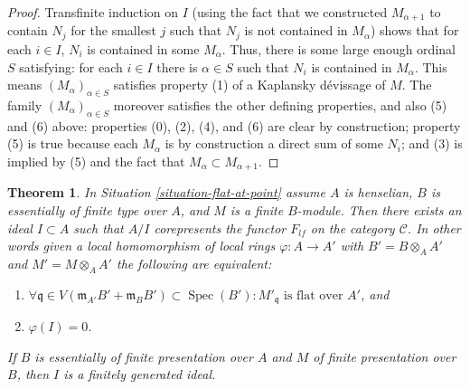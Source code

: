\documentclass{amsart}
\theoremstyle{plain}
\newtheorem{theorem}[subsection]{Theorem}
\theoremstyle{definition}
\theoremstyle{remark}
\numberwithin{equation}{subsection}
\def\Spec{\mathop{\mathrm{Spec}}}
\begin{document}
\begin{proof}
\medskip\noindent
Transfinite induction on $I$ (using the fact that we constructed
$M_{\alpha + 1}$
to contain $N_j$ for the smallest $j$ such that $N_j$ is not contained in
$M_{\alpha}$) shows that for each $i \in I$, $N_i$ is contained in some
$M_{\alpha}$.  Thus, there is some large enough ordinal $S$ satisfying: for
each $i \in I$ there is $\alpha \in S$ such that $N_i$ is contained in
$M_{\alpha}$.  This means $(M_{\alpha})_{\alpha \in S}$ satisfies property (1)
of a Kaplansky d\'evissage of $M$.  The family $(M_{\alpha})_{\alpha \in S}$
moreover satisfies the other defining properties, and also (5) and (6) above:
properties (0), (2), (4), and (6) are clear by construction;  property (5) is
true because each $M_{\alpha}$ is by construction a direct sum of some $N_i$;
and (3) is implied by (5) and the fact that $M_{\alpha} \subset M_{\alpha + 1}$.
\end{proof}


\begin{theorem}
\label{theorem-flattening-local}
In
Situation \ref{situation-flat-at-point}
assume $A$ is henselian, $B$ is essentially of finite type over $A$, and
$M$ is a finite $B$-module. Then there exists an ideal
$I \subset A$ such that $A/I$ corepresents the functor $F_{lf}$ on the category
$\mathcal{C}$. In other words given a local homomorphism of local rings
$\varphi : A \to A'$ with $B' = B \otimes_A A'$ and $M' = M \otimes_A A'$
the following are equivalent:
\begin{enumerate}
\item $\forall \mathfrak q \in V(\mathfrak m_{A'}B' + \mathfrak m_B B')
\subset \Spec(B') :
M'_{\mathfrak q}\text{ is flat over }A'$, and
\item $\varphi(I) = 0$.
\end{enumerate}
If $B$ is essentially of finite presentation over $A$ and $M$
of finite presentation over $B$, then $I$ is a finitely generated ideal.
\end{theorem}
\end{document}
